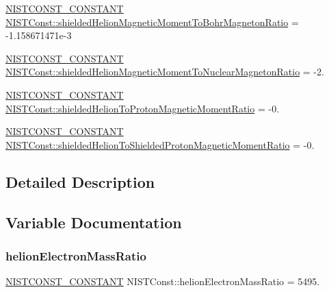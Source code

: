 \begin{DoxyCompactItemize}
\item 
\mbox{\hyperlink{group___n_i_s_t_const-_macros_ga2b0fc1d7452373f816175dd86ce26729}{N\+I\+S\+T\+C\+O\+N\+S\+T\+\_\+\+C\+O\+N\+S\+T\+A\+NT}} \mbox{\hyperlink{group___n_i_s_t_const-_helion_ga7b496ea143c3603e453977b9db2da2d7}{N\+I\+S\+T\+Const\+::shielded\+Helion\+Magnetic\+Moment\+To\+Bohr\+Magneton\+Ratio}} = -\/1.\+158671471e-\/3
\item 
\mbox{\hyperlink{group___n_i_s_t_const-_macros_ga2b0fc1d7452373f816175dd86ce26729}{N\+I\+S\+T\+C\+O\+N\+S\+T\+\_\+\+C\+O\+N\+S\+T\+A\+NT}} \mbox{\hyperlink{group___n_i_s_t_const-_helion_gaa9f99582deb07b11950247bb6aebf383}{N\+I\+S\+T\+Const\+::shielded\+Helion\+Magnetic\+Moment\+To\+Nuclear\+Magneton\+Ratio}} = -\/2.
\item 
\mbox{\hyperlink{group___n_i_s_t_const-_macros_ga2b0fc1d7452373f816175dd86ce26729}{N\+I\+S\+T\+C\+O\+N\+S\+T\+\_\+\+C\+O\+N\+S\+T\+A\+NT}} \mbox{\hyperlink{group___n_i_s_t_const-_helion_gafd8c45f976fd729ed29b2c49434a6ec1}{N\+I\+S\+T\+Const\+::shielded\+Helion\+To\+Proton\+Magnetic\+Moment\+Ratio}} = -\/0.
\item 
\mbox{\hyperlink{group___n_i_s_t_const-_macros_ga2b0fc1d7452373f816175dd86ce26729}{N\+I\+S\+T\+C\+O\+N\+S\+T\+\_\+\+C\+O\+N\+S\+T\+A\+NT}} \mbox{\hyperlink{group___n_i_s_t_const-_helion_gab3aafda5bad54b0ce79e85f2c142ebb2}{N\+I\+S\+T\+Const\+::shielded\+Helion\+To\+Shielded\+Proton\+Magnetic\+Moment\+Ratio}} = -\/0.
\end{DoxyCompactItemize}


\subsection{Detailed Description}


\subsection{Variable Documentation}
\mbox{\label{group___n_i_s_t_const-_helion_gadf681c0ed9b5f3fe2e62e225f129f699}} 
\subsubsection{\texorpdfstring{helion\+Electron\+Mass\+Ratio}{helionElectronMassRatio}}
{\footnotesize\ttfamily \mbox{\hyperlink{group___n_i_s_t_const-_macros_ga2b0fc1d7452373f816175dd86ce26729}{N\+I\+S\+T\+C\+O\+N\+S\+T\+\_\+\+C\+O\+N\+S\+T\+A\+NT}} N\+I\+S\+T\+Const\+::helion\+Electron\+Mass\+Ratio = 5495.}


